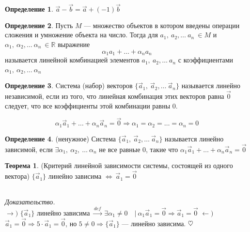 \documentclass{article}
\theoremstyle{definition}
\newtheorem{definition}{Определение}
\newtheorem{theorem}{Теорема}[section]
\newenvironment{ourproof}{\textit{\\ Доказательство.\\ }}{$\hfill \heartsuit$}
\begin{document}
\begin{definition}
$\vec a - \vec b = \vec a + (-1)\vec b$
\end{definition}

\begin{definition}
Пусть $M$ --- множество объектов в котором введены операции сложения и умножение объекта на число. Тогда для $a_1,\ a_2,\dots\ a_n\ \in M$ и $\alpha_1,\ \alpha_2,\dots \ \alpha_n\ \in \mathbb{R}$ выражение 
$$\alpha_1 a_1 + \dots + \alpha_n a_n$$
называется линейной комбинацией элементов $a_1,\ a_2,\dots\ a_n$ с коэффициентами $\alpha_1,\ \alpha_2,\dots \ \alpha_n$
\end{definition}


\begin{definition}
Cистема (набор) векторов $\{ \vec a_1,\ \vec a_2,\dots\ \vec a_n \}$ называется линейно независимой, если из того, что линейная комбинация этих векторов равна $\vec 0$ следует, что все коэффициенты этой комбинации равны $0$.

$$\alpha_1\vec a_1 + \dots + \alpha_n\vec a_n = \vec 0 \Longrightarrow \alpha_1 = \alpha_2 =\dots = \alpha_n = 0 $$
\end{definition}

\begin{definition}{(ненужное)}
Система $\{ \vec a_1,\ \vec a_2,\dots\ \vec a_n \}$ называется линейно зависимой, если $\exists \alpha_1,\ \alpha_2,\ \dots\ \alpha_n$ не все равные $0$, такие что $\alpha_1\vec a_1 + \dots + \alpha_n\vec a_n = \vec 0$
\end{definition}

\begin{theorem}{(Критерий линейной зависимости системы, состоящей из одного вектора)}
$\{\vec a_1\}$ линейно зависима $\Longleftrightarrow\ \vec a_1 = \vec 0$

\begin{ourproof}
$\longrightarrow )$ $\{\vec a_1\}$ линейно зависима $\xrightarrow{def}\ \exists\alpha_1\neq 0\quad |\ \alpha_1\vec a_1 = \vec 0 \Longrightarrow \vec a_1 = \vec 0$
\newline
$\longleftarrow )$ $\vec a_1 = \vec 0 \Longrightarrow 5\cdot\vec a_1 = \vec 0$, но $5\neq 0 \Longrightarrow \{\vec a_1\}$ --- линейно зависима.  
\end{ourproof}
\end{theorem}
\end{document}
